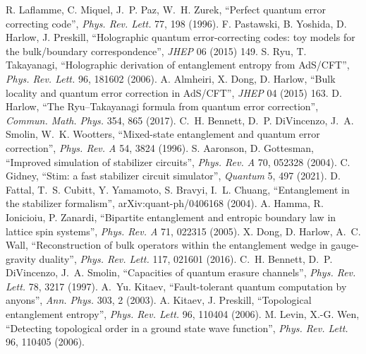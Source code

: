  R. Laflamme, C. Miquel, J.~P. Paz, W.~H. Zurek, ``Perfect quantum error correcting code'', \emph{Phys. Rev. Lett.}
77, 198 (1996).
 F. Pastawski, B. Yoshida, D. Harlow, J. Preskill, ``Holographic quantum error-correcting codes: toy models for the
bulk/boundary correspondence'', \emph{JHEP} 06 (2015) 149.
 S. Ryu, T. Takayanagi, ``Holographic derivation of entanglement entropy from AdS/CFT'', \emph{Phys. Rev. Lett.} 96, 181602
(2006).
 A. Almheiri, X. Dong, D. Harlow, ``Bulk locality and quantum error correction in AdS/CFT'', \emph{JHEP} 04 (2015) 163.
 D. Harlow, ``The Ryu--Takayanagi formula from quantum error correction'', \emph{Commun. Math. Phys.} 354, 865 (2017).
 C.~H. Bennett, D.~P. DiVincenzo, J.~A. Smolin, W.~K. Wootters, ``Mixed-state entanglement and quantum error correction'', \emph{Phys. Rev. A} 54, 3824 (1996).
 S. Aaronson, D. Gottesman, ``Improved simulation of stabilizer circuits'', \emph{Phys. Rev. A} 70, 052328 (2004).
 C. Gidney, ``Stim: a fast stabilizer circuit simulator'', \emph{Quantum} 5, 497 (2021).
 D. Fattal, T.~S. Cubitt, Y. Yamamoto, S. Bravyi, I.~L. Chuang, ``Entanglement in the stabilizer formalism'', arXiv:quant-ph/0406168 (2004).
 A. Hamma, R. Ionicioiu, P. Zanardi, ``Bipartite entanglement and entropic boundary law in lattice spin systems'', \emph{Phys. Rev. A} 71, 022315 (2005).
 X. Dong, D. Harlow, A.~C. Wall, ``Reconstruction of bulk operators within the entanglement wedge in gauge-gravity duality'', \emph{Phys. Rev. Lett.} 117, 021601 (2016).
 C.~H. Bennett, D.~P. DiVincenzo, J.~A. Smolin, ``Capacities of quantum erasure channels'', \emph{Phys. Rev. Lett.} 78, 3217 (1997).
 A.~Yu. Kitaev, ``Fault-tolerant quantum computation by anyons'', \emph{Ann. Phys.} 303, 2 (2003).
 A. Kitaev, J. Preskill, ``Topological entanglement entropy'', \emph{Phys. Rev. Lett.} 96, 110404 (2006).
 M. Levin, X.-G. Wen, ``Detecting topological order in a ground state wave function'', \emph{Phys. Rev. Lett.} 96, 110405 (2006).
